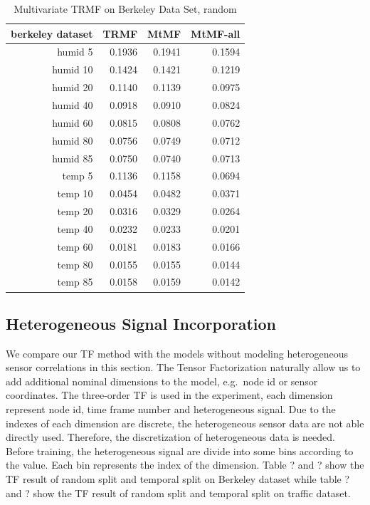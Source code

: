 \begin{table}[htbp]
\caption{Multivariate TRMF on Berkeley Data Set, random}
\label{traffic}
\begin{tabular}{r | r r r}
berkeley dataset	&TRMF	&MtMF	&MtMF-all \\ \hline
humid  5 &0.1936	&0.1941	&0.1594\\
humid 10 &0.1424	&0.1421	&0.1219\\
humid 20 &0.1140	&0.1139	&0.0975\\
humid 40 &0.0918	&0.0910	&0.0824\\
humid 60 &0.0815	&0.0808	&0.0762\\
humid 80 &0.0756	&0.0749	&0.0712\\
humid 85 &0.0750	&0.0740	&0.0713\\
 temp  5 &0.1136	&0.1158	&0.0694\\
 temp 10 &0.0454	&0.0482	&0.0371\\
 temp 20 &0.0316	&0.0329	&0.0264\\
 temp 40 &0.0232	&0.0233	&0.0201\\
 temp 60 &0.0181	&0.0183	&0.0166\\
 temp 80 &0.0155	&0.0155	&0.0144\\
 temp 85 &0.0158	&0.0159	&0.0142\\
\end{tabular}
\end{table}
\subsection{Heterogeneous Signal Incorporation}

We compare our TF method with the models without modeling heterogeneous sensor correlations in this section.
The Tensor Factorization naturally allow us to add additional nominal dimensions to the model, e.g.\ node id or sensor coordinates.
The three-order TF is used in the experiment, each dimension represent node id, time frame number and heterogeneous signal.  
Due to the indexes of each dimension are discrete, the heterogeneous sensor data are not able directly used.
Therefore, the discretization of heterogeneous data is needed.
Before training, the heterogeneous signal are divide into some bins according to the value.
Each bin represents the index of the dimension.
Table ? and ? show the TF result of random split and temporal split on Berkeley dataset while table ? and ? show the TF result of random split and temporal split on traffic dataset.

